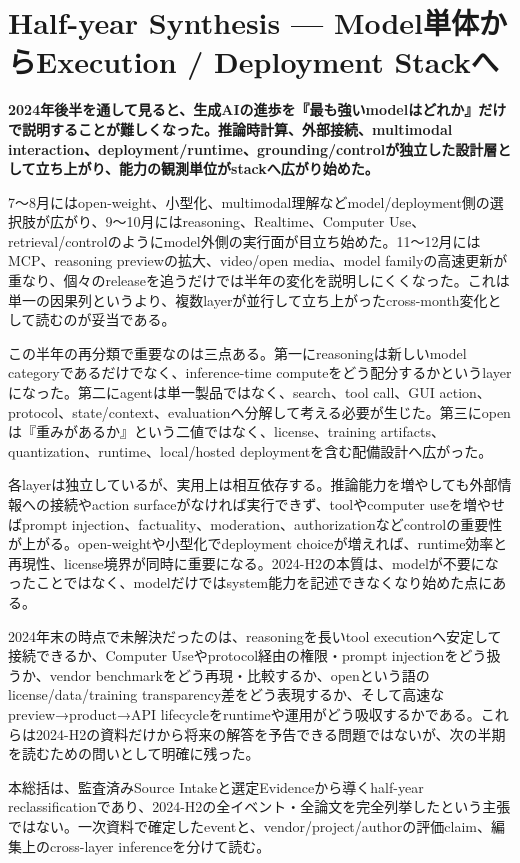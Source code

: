\section{Half-year Synthesis — Model単体からExecution / Deployment Stackへ}
\noindent\textbf{2024年後半を通して見ると、生成AIの進歩を『最も強いmodelはどれか』だけで説明することが難しくなった。推論時計算、外部接続、multimodal interaction、deployment/runtime、grounding/controlが独立した設計層として立ち上がり、能力の観測単位がstackへ広がり始めた。}\autocite{src-9cf289b414fd,src-bcbc025369e3}

7〜8月にはopen-weight、小型化、multimodal理解などmodel/deployment側の選択肢が広がり、9〜10月にはreasoning、Realtime、Computer Use、retrieval/controlのようにmodel外側の実行面が目立ち始めた。11〜12月にはMCP、reasoning previewの拡大、video/open media、model familyの高速更新が重なり、個々のreleaseを追うだけでは半年の変化を説明しにくくなった。これは単一の因果列というより、複数layerが並行して立ち上がったcross-month変化として読むのが妥当である。\autocite{src-bcbc025369e3,src-ee43656ed6da}


この半年の再分類で重要なのは三点ある。第一にreasoningは新しいmodel categoryであるだけでなく、inference-time computeをどう配分するかというlayerになった。第二にagentは単一製品ではなく、search、tool call、GUI action、protocol、state/context、evaluationへ分解して考える必要が生じた。第三にopenは『重みがあるか』という二値ではなく、license、training artifacts、quantization、runtime、local/hosted deploymentを含む配備設計へ広がった。\autocite{src-9cf289b414fd,src-ee43656ed6da}


各layerは独立しているが、実用上は相互依存する。推論能力を増やしても外部情報への接続やaction surfaceがなければ実行できず、toolやcomputer useを増やせばprompt injection、factuality、moderation、authorizationなどcontrolの重要性が上がる。open-weightや小型化でdeployment choiceが増えれば、runtime効率と再現性、license境界が同時に重要になる。2024-H2の本質は、modelが不要になったことではなく、modelだけではsystem能力を記述できなくなり始めた点にある。\autocite{src-3278a129a17e,src-9cf289b414fd}


2024年末の時点で未解決だったのは、reasoningを長いtool executionへ安定して接続できるか、Computer Useやprotocol経由の権限・prompt injectionをどう扱うか、vendor benchmarkをどう再現・比較するか、openという語のlicense/data/training transparency差をどう表現するか、そして高速なpreview→product→API lifecycleをruntimeや運用がどう吸収するかである。これらは2024-H2の資料だけから将来の解答を予告できる問題ではないが、次の半期を読むための問いとして明確に残った。\autocite{src-3278a129a17e,src-bcbc025369e3}


\begin{claimboundary}
本総括は、監査済みSource Intakeと選定Evidenceから導くhalf-year reclassificationであり、2024-H2の全イベント・全論文を完全列挙したという主張ではない。一次資料で確定したeventと、vendor/project/authorの評価claim、編集上のcross-layer inferenceを分けて読む。\autocite{src-bcbc025369e3}
\end{claimboundary}
